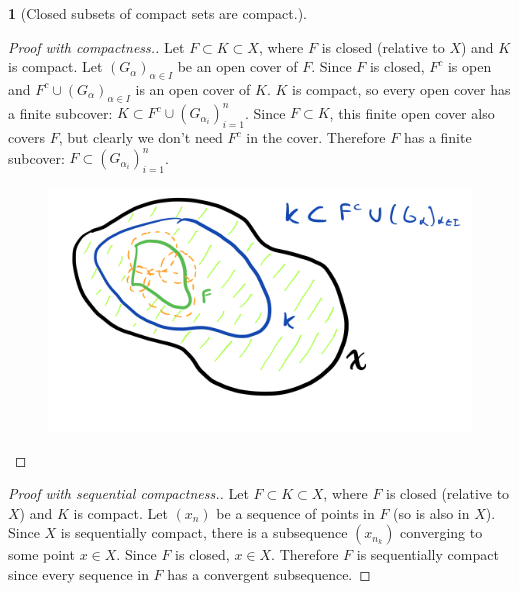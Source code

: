 \documentclass[12pt]{article}
\numberwithin{equation}{section}
\theoremstyle{plain}
\newtheorem{theorem}{\color{ForestGreen}{\textbf{Theorem}}}[section]
\theoremstyle{definition}
\newcommand{\1}{\mathbbm 1}
\begin{document}
\begin{theorem}[Closed subsets of compact sets are compact.]
\end{theorem}
\begin{proof}[Proof with compactness.]
	Let $F \subset K \subset X$, where $F$ is closed (relative to $X$) and $K$ is compact. Let $(G_\alpha)_{\alpha \in I}$ be an open cover of $F$. Since $F$ is closed, $F^c$ is open and $F^c \cup (G_\alpha)_{\alpha \in I}$ is an open cover of $K$. $K$ is compact, so every open cover has a finite subcover: $K \subset F^c \cup (G_{\alpha_i})_{i=1}^n$. Since $F \subset K$, this finite open cover also covers $F$, but clearly we don't need $F^c$ in the cover. Therefore $F$ has a finite subcover: $F \subset (G_{\alpha_i})_{i=1}^n$.

	\begin{figure}[H]
		\begin{center}
			\includegraphics[scale=.45]{closed_subsets_compact.png}
		\end{center}
	\end{figure}
\end{proof}

\begin{proof}[Proof with sequential compactness.]
	Let $F \subset K \subset X$, where $F$ is closed (relative to $X$) and $K$ is compact. Let $(x_n)$ be a sequence of points in $F$ (so is also in $X$). Since $X$ is sequentially compact, there is a subsequence $(x_{n_k})$ converging to some point $x \in X$. Since $F$ is closed, $x \in X$. Therefore $F$ is sequentially compact since every sequence in $F$ has a convergent subsequence. 
\end{proof}
\end{document}
